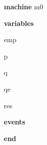 \begin{block}
  \item   \textbf{machine} m0
  \item   \textbf{variables}
  \begin{block}
    \item   emp
    \item   p
    \item   q
    \item   qe
    \item   res
  \end{block}
  \item   
  \item   \textbf{events}
  \begin{block}
    \item   
    \item   
    \item   
    \item   
    \item   
    \item   
  \end{block}
  \item   \textbf{end} \\
\end{block}
